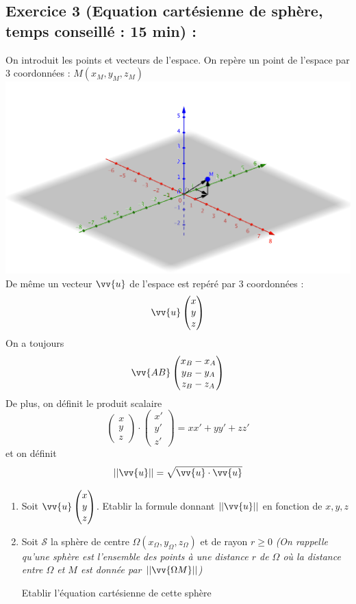 \subsection*{Exercice 3 (Equation cartésienne de sphère, temps conseillé : 15 min) : }
On introduit les points et vecteurs de l'espace. On repère un point de l'espace par 3 coordonnées : $M(x_M,y_M,z_M)$
\center
\includegraphics[scale=0.5]{chap7_ill.png}
\flushleft
De même un vecteur $\vv{u}$ de l'espace est repéré par 3 coordonnées : $$\vv{u} \begin{pmatrix} x \\ y \\ z\end{pmatrix}$$
On a toujours $$\vv{AB} \begin{pmatrix} x_B-x_A \\ y_B-y_A \\ z_B-z_A\end{pmatrix}$$
De plus, on définit le produit scalaire
$$\begin{pmatrix} x \\ y \\ z\end{pmatrix} \cdot \begin{pmatrix} x' \\ y' \\ z'\end{pmatrix} = xx' + yy' + zz'$$
et on définit $$||\vv{u}|| = \sqrt{\vv{u}\cdot \vv{u}}$$
\begin{enumerate}
\item Soit $\vv{u} \begin{pmatrix} x \\ y \\ z\end{pmatrix}$. Etablir la formule donnant $||\vv{u}||$ en fonction de $x,y,z$
\item Soit $\mathscr{S}$ la sphère de centre $\Omega(x_\Omega,y_\Omega,z_\Omega)$ et de rayon $r\geq 0$ \emph{(On rappelle qu'une sphère est l'ensemble des points à une distance $r$ de $\Omega$ où la distance entre $\Omega$ et $M$ est donnée par $||\vv{\Omega M}||$)}\newline

 Etablir l'équation cartésienne de cette sphère
\end{enumerate}
